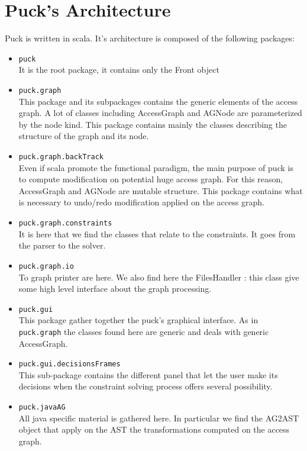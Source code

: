 \documentclass[]{article}
\begin{document}
\section{Puck's Architecture}
Puck is written in scala. It's architecture is composed of the following packages: 
\begin{itemize}
\item \verb|puck|\\
	It is the root package, it contains only the Front object

\item \verb|puck.graph|\\
	This package and its subpackages contains the generic elements of the access graph. A lot of classes including AccessGraph and AGNode are parameterized by the node kind. This package contains mainly the classes describing the structure of the graph and its node.

\item \verb|puck.graph.backTrack|\\
	Even if scala promote the functional paradigm, the main purpose of puck is to compute modification on potential huge access graph. For this reason, AccessGraph and AGNode are mutable structure. This package contains what is necessary to undo/redo modification applied on the access graph.

\item \verb|puck.graph.constraints|\\
	It is here that we find the classes that relate to the constraints. It goes from the parser to the solver.

\item \verb|puck.graph.io|\\
	To graph printer are here. We also find here the FilesHandler : this class give some high level interface about the graph processing.

\item \verb|puck.gui|\\
	This package gather together the puck's graphical interface. As in \verb|puck.graph| the classes found here are generic and deals with generic AccessGraph.
	
\item \verb|puck.gui.decisionsFrames|\\
	This sub-package contains the different panel that let the user make its decisions when the constraint solving process offers several possibility.
	
\item \verb|puck.javaAG|\\
	All java specific material is gathered here. 
	In particular we find the AG2AST object that apply on the AST the transformations computed on the access graph.


\end{itemize}
\end{document}
